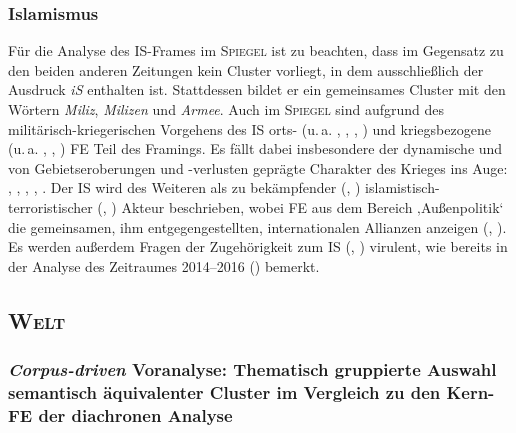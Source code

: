 \subsubsection{Islamismus}\label{islamismus-9}
\largerpage
Für die Analyse des IS-Frames im \textsc{Spiegel} ist zu beachten, dass im Gegensatz zu den beiden anderen Zeitungen kein Cluster vorliegt, in dem ausschließlich der Ausdruck \emph{iS} enthalten ist. Stattdessen bildet er ein gemeinsames Cluster mit den Wörtern \emph{Miliz}, \emph{Milizen} und \emph{Armee}. Auch im \textsc{Spiegel} sind aufgrund des militärisch-kriegerischen Vorgehens des IS orts- (u.\,a. , , , ) und kriegsbezogene (u.\,a. , , ) FE Teil des Framings. Es fällt dabei insbesondere der dynamische und von Gebietseroberungen und -verlusten geprägte Charakter des Krieges ins Auge: , , , , . Der IS wird des Weiteren als zu bekämpfender (, ) islamistisch-terroristischer (, ) Akteur beschrieben, wobei FE aus dem Bereich ‚Außenpolitik` die gemeinsamen, ihm entgegengestellten, internationalen Allianzen anzeigen (, ). Es werden außerdem Fragen der Zugehörigkeit zum IS (, ) virulent, wie bereits in der Analyse des Zeitraumes 2014--2016 () bemerkt.

\subsection{\texorpdfstring{\textsc{Welt}}{Welt}}\label{welt}

\subsubsection{\texorpdfstring{\emph{Corpus-driven} Voranalyse: Thematisch gruppierte Auswahl semantisch äquivalenter Cluster im Vergleich zu den Kern-FE der diachronen Analyse}{Corpus-driven Voranalyse: Thematisch gruppierte Auswahl semantisch äquivalenter Cluster im Vergleich zu den Kern-FE der diachronen Analyse}}\label{corpus-driven-voranalyse-thematisch-gruppierte-auswahl-semantisch-aequivalenter-cluster-im-vergleich-zu-den-kern-fe-der-diachronen-analyse-2}

